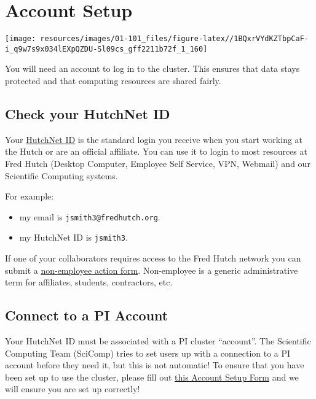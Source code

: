\documentclass[
]{book}
\providecommand{\tightlist}{%
  \setlength{\itemsep}{0pt}\setlength{\parskip}{0pt}}
\begin{document}
\hypertarget{account-setup}{%
\chapter{Account Setup}\label{account-setup}}

\texttt{[image: resources/images/01-101\_files/figure-latex//1BQxrVYdKZTbpCaF-i\_q9w7s9x034lEXpQZDU-Sl09cs\_gff2211b72f\_1\_160]}

You will need an account to log in to the cluster. This ensures that data stays protected and that computing resources are shared fairly.

\hypertarget{check-your-hutchnet-id}{%
\section{Check your HutchNet ID}\label{check-your-hutchnet-id}}

Your \href{https://centernet.fredhutch.org/cn/u/center-it/help-desk.html}{HutchNet ID} is the standard login you receive when you start working at the Hutch or are an official affiliate. You can use it to login to most resources at Fred Hutch (Desktop Computer, Employee Self Service, VPN, Webmail) and our Scientific Computing systems.

For example:

\begin{itemize}
\tightlist
\item
  my email is \texttt{jsmith3@fredhutch.org}.\\
\item
  my HutchNet ID is \texttt{jsmith3}.
\end{itemize}

If one of your collaborators requires access to the Fred Hutch network you can submit a \href{https://centernet.fredhutch.org/cn/f/hr/lcex/non-employee-action-form.html}{non-employee action form}. Non-employee is a generic administrative term for affiliates, students, contractors, etc.

\hypertarget{pi-account}{%
\section{Connect to a PI Account}\label{pi-account}}

Your HutchNet ID must be associated with a PI cluster ``account''. The Scientific Computing Team (SciComp) tries to set users up with a connection to a PI account before they need it, but this is not automatic! To ensure that you have been set up to use the cluster, please fill out \href{https://forms.gle/5ct8mQCeBD7LUt6S7}{this Account Setup Form} and we will ensure you are set up correctly!
\end{document}
